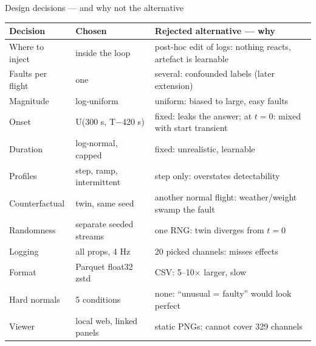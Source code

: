 \documentclass[aspectratio=169,11pt]{beamer}
\begin{document}
\begin{frame}{Design decisions --- and why not the alternative}
  \scriptsize
  \begin{tabularx}{\textwidth}{@{}l l L@{}}
    \toprule
    Decision & Chosen & Rejected alternative --- why \\
    \midrule
    Where to inject & inside the loop & post-hoc edit of logs: nothing reacts, artefact is learnable \\
    Faults per flight & one & several: confounded labels (later extension) \\
    Magnitude & log-uniform & uniform: biased to large, easy faults \\
    Onset & U(300 s, T$-$420 s) & fixed: leaks the answer; at $t=0$: mixed with start transient \\
    Duration & log-normal, capped & fixed: unrealistic, learnable \\
    Profiles & step, ramp, intermittent & step only: overstates detectability \\
    Counterfactual & twin, same seed & another normal flight: weather/weight swamp the fault \\
    Randomness & separate seeded streams & one RNG: twin diverges from $t=0$ \\
    Logging & all props, 4 Hz & 20 picked channels: misses effects \\
    Format & Parquet float32 zstd & CSV: 5--10$\times$ larger, slow \\
    Hard normals & 5 conditions & none: ``unusual = faulty'' would look perfect \\
    Viewer & local web, linked panels & static PNGs: cannot cover 329 channels \\
    \bottomrule
  \end{tabularx}
\end{frame}
\end{document}
